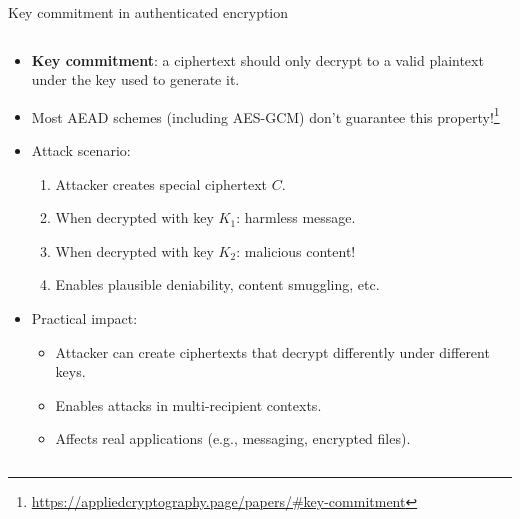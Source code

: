 \documentclass[aspectratio=169, lualatex, handout]{beamer}
\begin{document}
\begin{frame}{Key commitment in authenticated encryption}
	\begin{columns}[c]
		\begin{column}{1\textwidth}
			\begin{itemize}[<+->]
				\item \textbf{Key commitment}: a ciphertext should only decrypt to a valid plaintext under the key used to generate it.
				\item Most AEAD schemes (including AES-GCM) don't guarantee this property!\footnote{\url{https://appliedcryptography.page/papers/\#key-commitment}}
				\item Attack scenario:
				      \begin{enumerate}
					      \item Attacker creates special ciphertext $C$.
					      \item When decrypted with key $K_1$: harmless message.
					      \item When decrypted with key $K_2$: malicious content!
					      \item Enables plausible deniability, content smuggling, etc.
				      \end{enumerate}
				\item Practical impact:
				      \begin{itemize}
					      \item Attacker can create ciphertexts that decrypt differently under different keys.
					      \item Enables attacks in multi-recipient contexts.
					      \item Affects real applications (e.g., messaging, encrypted files).
				      \end{itemize}
			\end{itemize}
		\end{column}
	\end{columns}
\end{frame}
\end{document}
